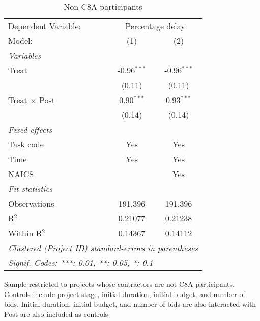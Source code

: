 \documentclass[
]{article}
\begin{document}
\begin{table}[htbp]
   \caption{Non-C8A participants}
   \centering
   \begin{tabular}{lcc}
      \tabularnewline \midrule \midrule
      Dependent Variable: & \multicolumn{2}{c}{Percentage delay}\\
      Model:               & (1)           & (2)\\  
      \midrule
      \emph{Variables}\\
      Treat                & -0.96$^{***}$ & -0.96$^{***}$\\   
                           & (0.11)        & (0.11)\\   
      Treat $\times$ Post  & 0.90$^{***}$  & 0.93$^{***}$\\   
                           & (0.14)        & (0.14)\\   
      \midrule
      \emph{Fixed-effects}\\
      Task code            & Yes           & Yes\\  
      Time                 & Yes           & Yes\\  
      NAICS                &               & Yes\\  
      \midrule
      \emph{Fit statistics}\\
      Observations         & 191,396       & 191,396\\  
      R$^2$                & 0.21077       & 0.21238\\  
      Within R$^2$         & 0.14367       & 0.14112\\  
      \midrule \midrule
      \multicolumn{3}{l}{\emph{Clustered (Project ID) standard-errors in parentheses}}\\
      \multicolumn{3}{l}{\emph{Signif. Codes: ***: 0.01, **: 0.05, *: 0.1}}\\
   \end{tabular}
   
   \par \raggedright 
   Sample restricted to projects whose contractors are not C8A participants. Controls include project stage, initial duration, initial budget, and number of bids. Initial duration, initial budget, and number of bids are also interacted with Post are also included as controls
\end{table}
\end{document}
